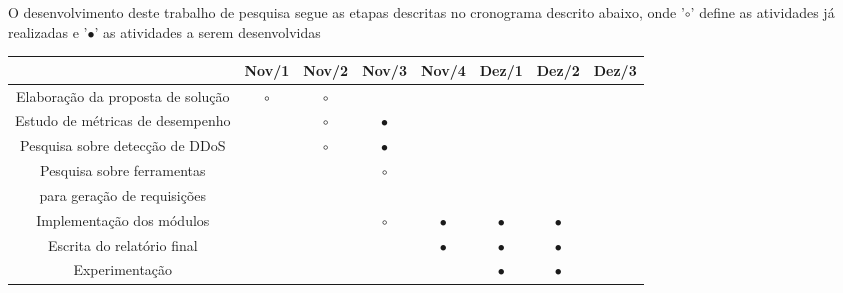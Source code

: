 
O desenvolvimento deste trabalho de pesquisa segue as etapas descritas no cronograma descrito abaixo, onde '$\circ$' define as atividades já realizadas e '$\bullet$' as atividades a serem desenvolvidas 
{\footnotesize
\center
\begin{table}[ht!]
\footnotesize
\center
\begin{tabular}{|c||c|c|c|c|c|c|c|}
\hline

      & \textbf{Nov/1} & \textbf{Nov/2} & \textbf{Nov/3} & \textbf{Nov/4} & \textbf{Dez/1} & \textbf{Dez/2} & \textbf{Dez/3} \\
\hline
\hline
Elaboração da proposta de solução      &  {$\circ$} & {$\circ$} &  &  &  &  &  \\
\hline						
Estudo de métricas de desempenho      &  & {$\circ$} & $\bullet$ &  &  & &  \\
\hline									

Pesquisa sobre detecção de DDoS      &  & {$\circ$} & $\bullet$  &  &  &  &  \\
\hline									


Pesquisa sobre ferramentas       &  &  & {$\circ$} &  &  &  &  \\
para geração de requisições       &   &   &   &   &   &   &   \\
\hline									


Implementação dos módulos      &  &  &  {$\circ$} & $\bullet$ & $\bullet$ & $\bullet$ &  \\
\hline									

Escrita do relatório final      &  &   &  & $\bullet$  & $\bullet$ &  $\bullet$ &  \\
\hline

Experimentação      &  &  &  &  &$\bullet$  & $\bullet$ &  \\
\hline
\end{tabular}
\label{tab:crono}
\end{table}
}
